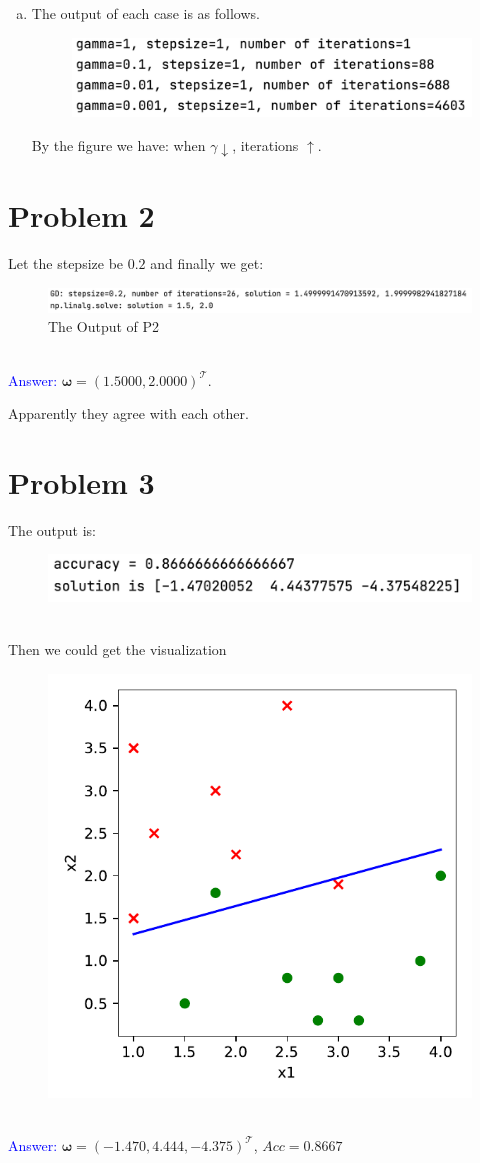 \documentclass{article}
\def\bw{\boldsymbol{\omega}}
\begin{document}
\begin{enumerate}[(a).]
		\newpage
	\item
		The output of each case is as follows.
		\begin{figure}[h]
			\centering
			\includegraphics[width=0.7\linewidth]{p1d.png}
		\end{figure}

		By the figure we have: when $\gamma\downarrow$, iterations $\uparrow$.
\end{enumerate}


\section*{Problem 2}

Let the stepsize be $0.2$ and finally we get:
\begin{figure}[h]
	\centering
	\includegraphics[width=0.9\linewidth]{p2.png}
	\caption{The Output of P2}
\end{figure}
\\
\textcolor{blue}{Answer:} $\bw=(1.5000,2.0000)^{\mathcal{T}}$.

Apparently they agree with each other.

\section*{Problem 3}

The output is:
\begin{figure}[h]
	\centering
	\includegraphics[width=0.5\linewidth]{p3.png}
\end{figure}
\\
Then we could get the visualization

\begin{figure}[H]
	\centering
	\includegraphics[width=0.5\linewidth]{p3.pdf}
\end{figure}
\\
\textcolor{blue}{Answer:} $\bw = (-1.470,4.444,-4.375)^{\mathcal{T}}$, $Acc = 0.8667$
\newpage
\end{document}
